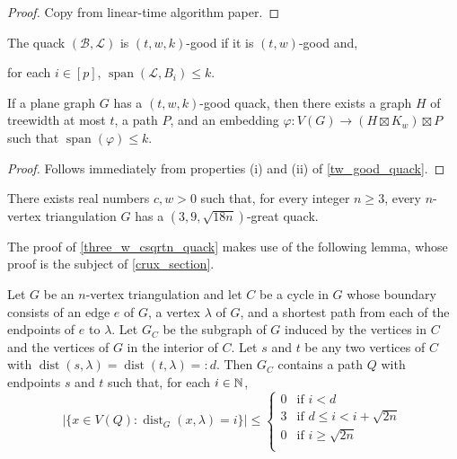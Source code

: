 \documentclass{patmorin}
\newcommand{\defin}[1]{\emph{\textcolor{brightmaroon}{#1}}}
\DeclareMathOperator{\spn}{span}
\DeclareMathOperator{\dist}{dist}
\begin{document}
\begin{proof}
  Copy from linear-time algorithm paper.
\end{proof}

The quack $(\mathcal{B},\mathcal{L})$ is $(t,w,k)$-good if it is $(t,w)$-good and,
\begin{compactenum}[({good-}a)]\setcounter{enumi}{18}
  \item for each $i\in[p]$, $\spn(\mathcal{L},B_i)\le k$.
\end{compactenum}

\begin{lem}
  If a plane graph $G$ has a $(t,w,k)$-good quack, then there exists a graph $H$ of treewidth at most $t$, a path $P$, and an embedding $\varphi:V(G)\to (H\boxtimes K_w)\boxtimes P$ such that $\spn(\varphi)\le k$.
\end{lem}

\begin{proof}
  Follows immediately from properties (i) and (ii) of \cref{tw_good_quack}.
\end{proof}






\begin{thm}\label{three_w_csqrtn_quack}
  There exists real numbers $c,w>0$ such that, for every integer $n\ge 3$, every $n$-vertex triangulation $G$ has a $(3,9,\sqrt{18n})$-great quack.
\end{thm}


The proof of \cref{three_w_csqrtn_quack} makes use of the following lemma, whose proof is the subject of \cref{crux_section}.

\begin{lem}\label{awesome_path}
  Let $G$ be an $n$-vertex triangulation and let $C$ be a cycle in $G$ whose boundary consists of an edge $e$ of $G$, a vertex $\lambda$ of $G$, and a shortest path from each of the endpoints of $e$ to $\lambda$.  Let $G_C$ be the subgraph of $G$ induced by the vertices in $C$ and the vertices of $G$ in the interior of $C$.  Let $s$ and $t$ be any two vertices of $C$ with $\dist(s,\lambda)=\dist(t,\lambda)=:d$.  Then $G_C$ contains a path $Q$ with endpoints $s$ and $t$ such that, for each $i\in\mathbb{N}$,
    \[  |\{x\in V(Q):\dist_G(x,\lambda)=i\}| \le
      \begin{cases}
        0 & \text{if $i < d$} \\
        3 & \text{if $d\le i < i+\sqrt{2n}$} \\
        0 & \text{if $i \ge \sqrt{2n}$} \\
      \end{cases}
    \]
\end{lem}
\end{document}
